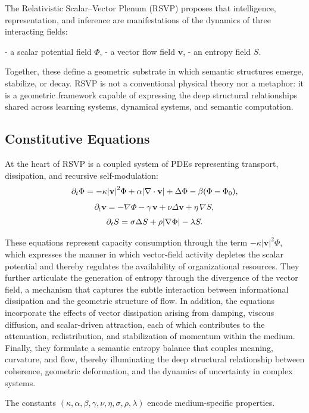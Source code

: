 \documentclass[12pt]{article}
\theoremstyle{plain}
\theoremstyle{definition}
\theoremstyle{remark}
\begin{document}
The Relativistic Scalar--Vector Plenum (RSVP) proposes that intelligence,
representation, and inference are manifestations of the dynamics of three
interacting fields:

- a scalar potential field $\Phi$,  
- a vector flow field $\mathbf{v}$,  
- an entropy field $S$.

Together, these define a geometric substrate in which semantic structures
emerge, stabilize, or decay. RSVP is not a conventional physical theory nor
a metaphor: it is a geometric framework capable of expressing the deep 
structural relationships shared across learning systems, dynamical systems,
and semantic computation.

\subsection{Constitutive Equations}

At the heart of RSVP is a coupled system of PDEs representing transport,
dissipation, and recursive self-modulation:
\[
\partial_t \Phi = -\kappa \abs{\mathbf{v}}^2 \Phi
                  + \alpha \abs{\nabla\cdot \mathbf{v}}
                  + \Delta \Phi
                  - \beta (\Phi - \Phi_0),
\]
\[
\partial_t \mathbf{v} 
= -\nabla \Phi
  - \gamma\, \mathbf{v}
  + \nu \Delta \mathbf{v}
  + \eta\, \nabla S,
\]
\[
\partial_t S
= \sigma \Delta S
  + \rho \abs{\nabla \Phi}
  - \lambda S.
\]

These equations represent capacity consumption through the term $-\kappa \lvert \mathbf{v} \rvert^{2} \Phi$, which expresses the manner in which vector-field activity depletes the scalar potential and thereby regulates the availability of organizational resources. They further articulate the generation of entropy through the divergence of the vector field, a mechanism that captures the subtle interaction between informational dissipation and the geometric structure of flow. In addition, the equations incorporate the effects of vector dissipation arising from damping, viscous diffusion, and scalar-driven attraction, each of which contributes to the attenuation, redistribution, and stabilization of momentum within the medium. Finally, they formulate a semantic entropy balance that couples meaning, curvature, and flow, thereby illuminating the deep structural relationship between coherence, geometric deformation, and the dynamics of uncertainty in complex systems.


The constants $(\kappa,\alpha,\beta,\gamma,\nu,\eta,\sigma,\rho,\lambda)$ 
encode medium-specific properties.
\end{document}
